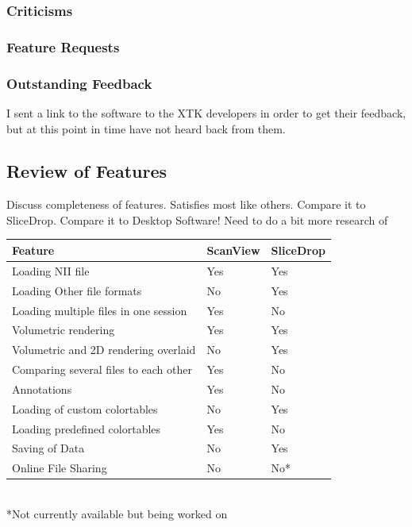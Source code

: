 \documentclass[a4paper,11pt,titlepage]{article}
\begin{document}
\subsubsection{Criticisms}


\subsubsection{Feature Requests}


\subsubsection{Outstanding Feedback}

I sent a link to the software to the XTK developers in order to get their feedback, but at this point in time have not heard back from them.



\subsection{Review of Features}


Discuss completeness of features. Satisfies most like others.
Compare it to SliceDrop. Compare it to Desktop Software!
Need to do a bit more research of



\begin{center}

  \begin{tabular}{ | l | l | l |}
    \hline
    Feature & ScanView & SliceDrop \\ \hline \hline

Loading NII file & Yes & Yes \\ \hline
Loading Other file formats & No & Yes \\ \hline
Loading multiple files in one session & Yes & No \\ \hline
Volumetric rendering & Yes & Yes \\ \hline
Volumetric and 2D rendering overlaid & No & Yes \\ \hline
Comparing several files to each other & Yes & No \\ \hline
Annotations & Yes & No \\ \hline
Loading of custom colortables & No & Yes \\ \hline
Loading predefined colortables & Yes & No \\ \hline
Saving of Data & No & Yes \\ \hline
Online File Sharing & No & No* \\ \hline

  \end{tabular}\\


*Not currently available but being worked on


\end{center}
\end{document}
